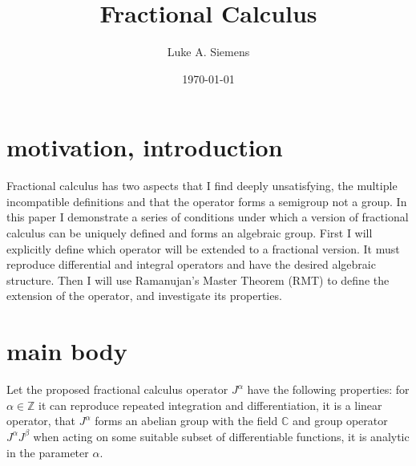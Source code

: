 \documentclass[%
 preprint,
 amsmath, amssymb, aps, pra, 10pt
]{revtex4-2}
\begin{document}
\title{Fractional Calculus}%
\author{Luke A. Siemens}
\noaffiliation
\date{\today}
\maketitle

\section{motivation, introduction}
Fractional calculus has two aspects that I find deeply unsatisfying, the multiple incompatible definitions and that the operator forms a semigroup not a group. In this paper I demonstrate a series of conditions under which a version of fractional calculus can be uniquely defined and forms an algebraic group. First I will explicitly define which operator will be extended to a fractional version. It must reproduce differential and integral operators and have the desired algebraic structure. Then I will use Ramanujan's Master Theorem (RMT) to define the extension of the operator, and investigate its properties.  
\section{main body}
Let the proposed fractional calculus operator $J^\alpha$ have the following properties: for $\alpha \in \mathbb{Z}$ it can reproduce repeated integration and differentiation, it is a linear operator, that $J^\alpha$ forms an abelian group with the field $\mathbb{C}$ and group operator $J^\alpha J^\beta$ when acting on some suitable subset of differentiable functions, it is analytic in the parameter $\alpha$.
\end{document}
